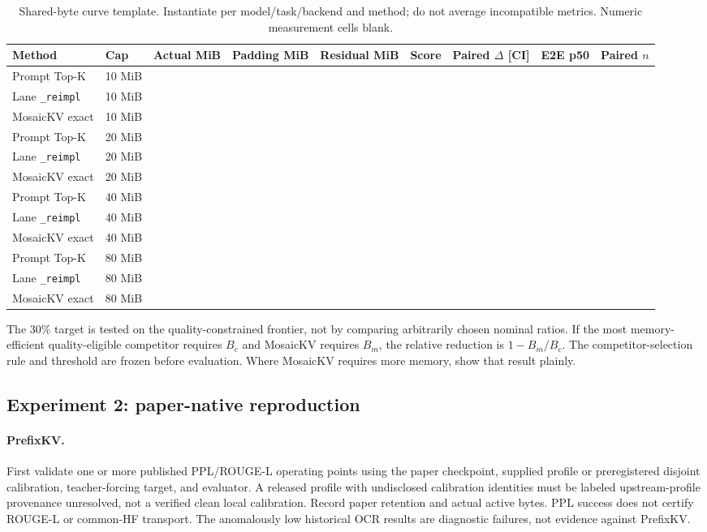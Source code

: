\begin{table}[t]
\caption{Shared-byte curve template. Instantiate per model/task/backend and
method; do not average incompatible metrics. Numeric measurement cells blank.}
\small\begin{tabular}{llrrrrrrr}\toprule
Method & Cap & Actual MiB & Padding MiB & Residual MiB & Score & Paired $\Delta$ [CI] & E2E p50 & Paired $n$\\\midrule
Prompt Top-K & 10 MiB & & & & & & & \\
Lane \texttt{\_reimpl} & 10 MiB & & & & & & & \\
MosaicKV exact & 10 MiB & & & & & & & \\
Prompt Top-K & 20 MiB & & & & & & & \\
Lane \texttt{\_reimpl} & 20 MiB & & & & & & & \\
MosaicKV exact & 20 MiB & & & & & & & \\
Prompt Top-K & 40 MiB & & & & & & & \\
Lane \texttt{\_reimpl} & 40 MiB & & & & & & & \\
MosaicKV exact & 40 MiB & & & & & & & \\
Prompt Top-K & 80 MiB & & & & & & & \\
Lane \texttt{\_reimpl} & 80 MiB & & & & & & & \\
MosaicKV exact & 80 MiB & & & & & & & \\
\bottomrule\end{tabular}
\end{table}

The 30\% target is tested on the quality-constrained frontier, not by comparing
arbitrarily chosen nominal ratios. If the most memory-efficient quality-eligible
competitor requires $B_c$ and MosaicKV requires $B_m$, the relative reduction
is $1-B_m/B_c$. The competitor-selection rule and threshold are frozen before
evaluation. Where MosaicKV requires more memory, show that result plainly.

\subsection{Experiment 2: paper-native reproduction}
\paragraph{PrefixKV.}
First validate one or more published PPL/ROUGE-L operating points using the
paper checkpoint, supplied profile or preregistered disjoint calibration,
teacher-forcing target, and evaluator. A released profile with undisclosed
calibration identities must be labeled upstream-profile provenance unresolved,
not a verified clean local calibration. Record paper retention and actual
active bytes. PPL success does not certify ROUGE-L or common-HF transport.
The anomalously low historical OCR results are diagnostic failures, not evidence
against PrefixKV.

